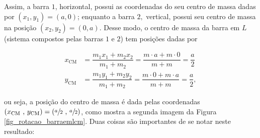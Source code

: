 Assim, a barra $1$, horizontal, possui as coordenadas do seu centro de massa dadas por $(x_1 , y_1) = (a,0)$; enquanto a barra $2,$ vertical, possui seu centro de massa na posição $(x_2 , y_2) = (0,a).$ Desse modo, o centro de massa da barra em $L$ (sistema compostos pelas barras $1$ e $2$) tem posições dadas por

\begin{align}
    x_\text{CM} & = \dfrac{m_1 x_1 + m_2x_2}{m_1 + m_2} = \dfrac{m \cdot a + m \cdot 0}{m+m} = \dfrac{a}{2} \nonumber \\
     y_\text{CM} & = \dfrac{m_1 y_1 + m_2y_2}{m_1 + m_2} =  \dfrac{m \cdot 0 + m \cdot a}{m+m} = \dfrac{a}{2}, \nonumber
\end{align}

\noindent ou seja, a posição do centro de massa é dada pelas coordenadas $(x_\text{CM} \text{ , } y_\text{CM}) = (\sfrac{a}{2} \text{ , } \sfrac{a}{2}  )$, como mostra a segunda imagem da Figura \ref{fig_rotacao_barraemlcm}. Duas coisas são importantes de se notar neste resultado:

